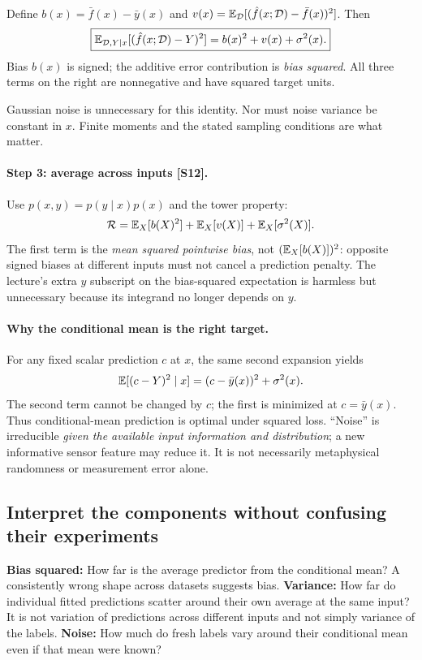 \begin{keyidea}
Define $b(x)=\bar f(x)-\bar y(x)$ and $v(x)=\mathbb{E}_{\mathcal D}[(\hat f(x;\mathcal D)-\bar f(x))^2]$. Then
\begin{equation}
\boxed{\mathbb{E}_{\mathcal D,Y\mid x}[(\hat f(x;\mathcal D)-Y)^2]
=b(x)^2+v(x)+\sigma^2(x).}
\label{eq:reg:decomp}
\end{equation}
Bias $b(x)$ is signed; the additive error contribution is \emph{bias squared}. All three terms on the right are nonnegative and have squared target units.
\end{keyidea}
Gaussian noise is unnecessary for this identity. Nor must noise variance be constant in $x$. Finite moments and the stated sampling conditions are what matter.

\paragraph{Step 3: average across inputs [S12].}
Use $p(x,y)=p(y\mid x)p(x)$ and the tower property:
\begin{equation}
\mathcal R=\mathbb{E}_X[b(X)^2]+\mathbb{E}_X[v(X)]+\mathbb{E}_X[\sigma^2(X)].
\label{eq:reg:integrated}
\end{equation}
The first term is the \emph{mean squared pointwise bias}, not $(\mathbb{E}_X[b(X)])^2$: opposite signed biases at different inputs must not cancel a prediction penalty. The lecture's extra $y$ subscript on the bias-squared expectation is harmless but unnecessary because its integrand no longer depends on $y$.

\paragraph{Why the conditional mean is the right target.}
For any fixed scalar prediction $c$ at $x$, the same second expansion yields
\[
\mathbb{E}[(c-Y)^2\mid x]=(c-\bar y(x))^2+\sigma^2(x).
\]
The second term cannot be changed by $c$; the first is minimized at $c=\bar y(x)$. Thus conditional-mean prediction is optimal under squared loss. ``Noise'' is irreducible \emph{given the available input information and distribution}; a new informative sensor feature may reduce it. It is not necessarily metaphysical randomness or measurement error alone.

\subsection{Interpret the components without confusing their experiments}
\label{sec:reg:interpret}
\textbf{Bias squared:} How far is the average predictor from the conditional mean? A consistently wrong shape across datasets suggests bias. \textbf{Variance:} How far do individual fitted predictions scatter around their own average at the same input? It is not variation of predictions across different inputs and not simply variance of the labels. \textbf{Noise:} How much do fresh labels vary around their conditional mean even if that mean were known?

